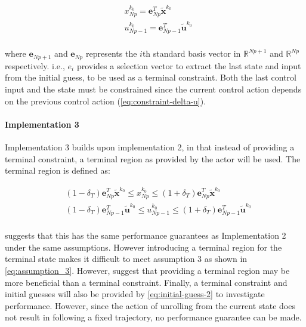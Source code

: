 \begin{equation}\label{eq:terminal-constraint-ocp}
	\begin{aligned}
		& x^{k_0}_{Np} = \mathbf{e}_{Np}^T \tilde{\mathbf{x}}^{k_0}\\
		& u^{k_0}_{Np-1} = \mathbf{e}_{Np-1}^T\tilde{\mathbf{u}}^{k_0}\\
	\end{aligned}
\end{equation}

where $\mathbf{e}_{Np+1}$ and $\mathbf{e}_{Np}$ represents the $i$th standard basis vector in $\mathbb{R}^{Np+1}$ and $\mathbb{R}^{Np}$ respectively. i.e., $e_i$ provides a selection vector to extract the last state and input from the initial guess, to be used as a terminal constraint. Both the last control input and the state must be constrained since the current control action depends on the previous control action (\autoref{eq:constraint-delta-u}).

\paragraph{Implementation 3}
Implementation 3 builds upon implementation 2, in that instead of providing a terminal constraint, a terminal region as provided by the actor will be used. The terminal region is defined as:

\begin{equation}\label{eq:terminal-region}
	\begin{aligned}
		& (1-\delta_T)\mathbf{e}_{Np}^T \tilde{\mathbf{x}}^{k_0} \leq x^{k_0}_{Np} \leq (1+\delta_T)\mathbf{e}_{Np}^T \tilde{\mathbf{x}}^{k_0}\\
		&(1-\delta_T)\mathbf{e}_{Np-1}^T\tilde{\mathbf{u}}^{k_0} \leq u^{k_0}_{Np-1} \leq (1+\delta_T) \mathbf{e}_{Np-1}^T\tilde{\mathbf{u}}^{k_0}\\
	\end{aligned}
\end{equation}

\cite{amritEconomicOptimizationUsing2011} suggests that this has the same performance guarantees as Implementation 2 under the same assumptions. However introducing a terminal region for the terminal state makes it difficult to meet assumption 3 as shown in \autoref{eq:assumption_3}. However, \cite{amritEconomicOptimizationUsing2011} suggest that providing a terminal region may be more beneficial than a terminal constraint. Finally, a terminal constraint and initial guesses will also be provided by \autoref{eq:initial-guess-2} to investigate performance. However, since the action of unrolling from the current state does not result in following a fixed trajectory, no performance guarantee can be made.

